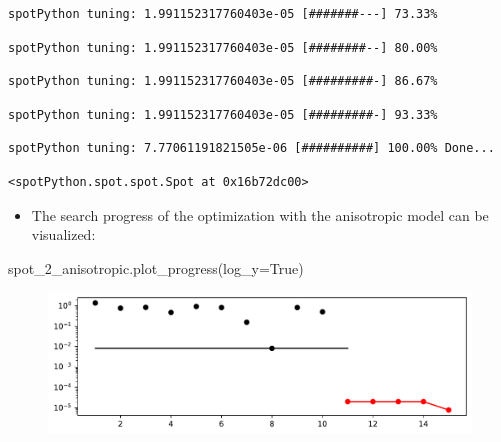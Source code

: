 \documentclass[
  letterpaper,
  DIV=11,
  numbers=noendperiod]{scrreprt}
\newenvironment{Shaded}{\begin{snugshade}}{\end{snugshade}}
\newcommand{\NormalTok}[1]{\textcolor[rgb]{0.00,0.23,0.31}{#1}}
\newcommand{\OperatorTok}[1]{\textcolor[rgb]{0.37,0.37,0.37}{#1}}
\newcommand{\VariableTok}[1]{\textcolor[rgb]{0.07,0.07,0.07}{#1}}
\providecommand{\tightlist}{%
  \setlength{\itemsep}{0pt}\setlength{\parskip}{0pt}}\usepackage{longtable,booktabs,array}
\begin{document}
\begin{verbatim}
spotPython tuning: 1.991152317760403e-05 [#######---] 73.33% 
\end{verbatim}

\begin{verbatim}
spotPython tuning: 1.991152317760403e-05 [########--] 80.00% 
\end{verbatim}

\begin{verbatim}
spotPython tuning: 1.991152317760403e-05 [#########-] 86.67% 
\end{verbatim}

\begin{verbatim}
spotPython tuning: 1.991152317760403e-05 [#########-] 93.33% 
\end{verbatim}

\begin{verbatim}
spotPython tuning: 7.77061191821505e-06 [##########] 100.00% Done...
\end{verbatim}

\begin{verbatim}
<spotPython.spot.spot.Spot at 0x16b72dc00>
\end{verbatim}

\begin{itemize}
\tightlist
\item
  The search progress of the optimization with the anisotropic model can
  be visualized:
\end{itemize}

\begin{Shaded}
\begin{Highlighting}[]
\NormalTok{spot\_2\_anisotropic.plot\_progress(log\_y}\OperatorTok{=}\VariableTok{True}\NormalTok{)}
\end{Highlighting}
\end{Shaded}

\begin{figure}[H]

{\centering \includegraphics{03_spot_anisotropic_files/figure-pdf/cell-9-output-1.pdf}

}

\end{figure}
\end{document}
